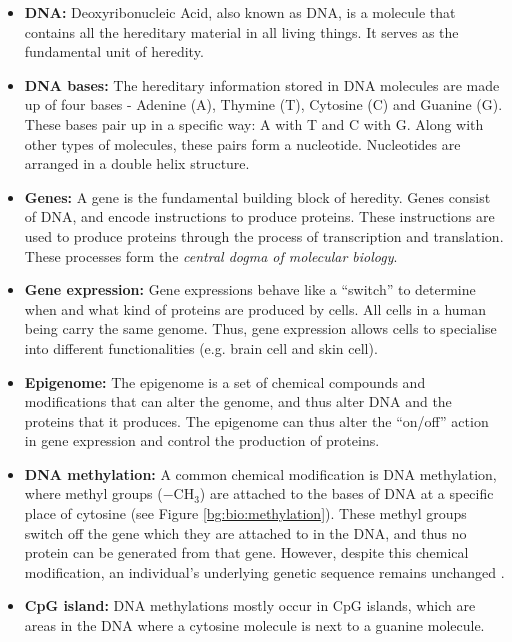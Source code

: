 \documentclass[12pt, twoside, a4paper]{report}
\begin{document}
\begin{itemize}
\item \textbf{DNA:} Deoxyribonucleic Acid, also known as DNA, is a molecule that contains all the hereditary material in all living things. It serves as the fundamental unit of heredity.

\item \textbf{DNA bases:} The hereditary information stored in DNA molecules are made up of four bases - Adenine (A), Thymine (T), Cytosine (C) and Guanine (G). These bases pair up in a specific way: A with T and C with G. Along with other types of molecules, these pairs form a nucleotide. Nucleotides are arranged in a double helix structure.

\item \textbf{Genes:} A gene is the fundamental building block of heredity. Genes consist of DNA, and encode instructions to produce proteins. These instructions are used to produce proteins through the process of transcription and translation. These processes form the \textit{central dogma of molecular biology}.

\item \textbf{Gene expression:} Gene expressions behave like a ``switch'' to determine when and what kind of proteins are produced by cells. All cells in a human being carry the same genome. Thus, gene expression allows cells to specialise into different functionalities (e.g. brain cell and skin cell).

\item \textbf{Epigenome:} The epigenome is a set of chemical compounds and modifications that can alter the genome, and thus alter DNA and the proteins that it produces. The epigenome can thus alter the ``on/off'' action in gene expression and control the production of proteins.


\item \textbf{DNA methylation:} A common chemical modification is DNA methylation, where methyl groups ($-$CH$_3$) are attached to the bases of DNA at a specific place of cytosine (see Figure \ref{bg:bio:methylation}). These methyl groups switch off the gene which they are attached to in the DNA, and thus no protein can be generated from that gene. However, despite this chemical modification, an individual's underlying genetic sequence remains unchanged \cite{RefWorks:249}.

\item \textbf{CpG island:} DNA methylations mostly occur in CpG islands, which are areas in the DNA where a cytosine molecule is next to a guanine molecule. 
\end{itemize}
\end{document}
